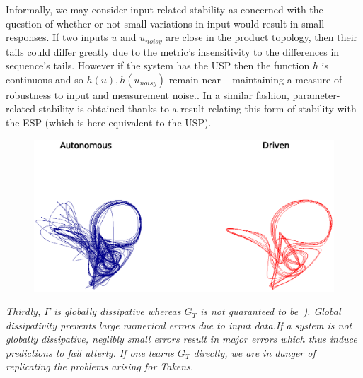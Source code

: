 \documentclass[a4paper,12pt,twoside]{report}
\begin{document}
Informally, we may consider input-related stability as concerned with the question of whether or not small variations in input would result in small responses.   
If two inputs $u$ and $u_{noisy}$ are close in the product topology, then their tails could differ greatly due to the metric's insensitivity to the differences in sequence's tails.
 However if the system has the USP then the function $h$ is continuous and so $h(u), h(u_{noisy})$ remain near – maintaining a measure of robustness to input and measurement noise.\cite{manjunath2021universal}.
In a similar fashion, parameter-related stability is obtained thanks to a result \cite[Lemma 3.2]{manjunath2020stability} relating this form of stability with the ESP (which is here equivalent to the USP).



\begin{figure}[ht]
  \includegraphics[scale=0.5]{_AutovsDriven.eps}
  \centering
  \label{fig:learningFailure}
\end{figure}

\emph{Thirdly, $\Gamma$ is globally dissipative whereas $G_T$ is not guaranteed to be~\cite{manjunath2021universal}). 
Global dissipativity prevents large numerical errors due to input data.If a system is not globally dissipative, neglibly small errors result in major errors which thus induce predictions to fail utterly. If one learns $G_T$ directly, we are in danger of replicating the problems arising for Takens. }
\end{document}
